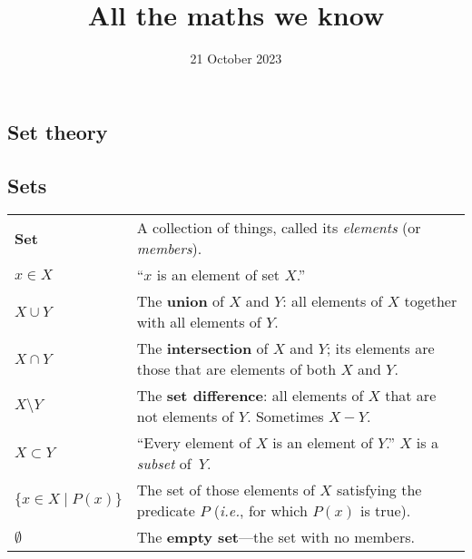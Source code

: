 \documentclass[10pt, a4paper, landscape]{article}
\title{All the maths we know}
\date{21 October 2023}
\author{}
\newcommand{\defn}[1]{\textbf{#1}}
\begin{document}
\begin{multicols*}{3}\raggedcolumns%
\maketitle

\section*{Set theory}
\subsection*{Sets}
\begin{tabularx}{\columnwidth}{@{}l>{\raggedright\arraybackslash}X@{}}
  \toprule
  \defn{Set} & A collection of things, called its \emph{elements} (or \emph{members}). \\

  $x \in X$    & ``$x$ is an element of set $X$.'' \\

  $X\cup Y$     & The \defn{union} of $X$ and $Y$: all elements of $X$ together with all elements of $Y$. \\

  $X\cap Y$     & The \defn{intersection} of $X$ and $Y$; its elements are
  those that are elements of both $X$ and $Y$. \\

  $X \setminus Y$      & The \defn{set difference}: all elements of $X$ that are not elements of $Y$. Sometimes $X-Y$. \\

  $X \subset Y$    & ``Every element of $X$ is an element of $Y$.'' $X$ is a \emph{subset} of~$Y$. \\

  $\{x\in X\mid P(x)\}$ & The set of those elements of $X$ satisfying the
  predicate $P$ (\textit{i.e.}, for which $P(x)$ is true). \\

  $\emptyset$        & The \defn{empty set}---the set with no members. \\

\end{tabularx}



\end{multicols*}
\end{document}

